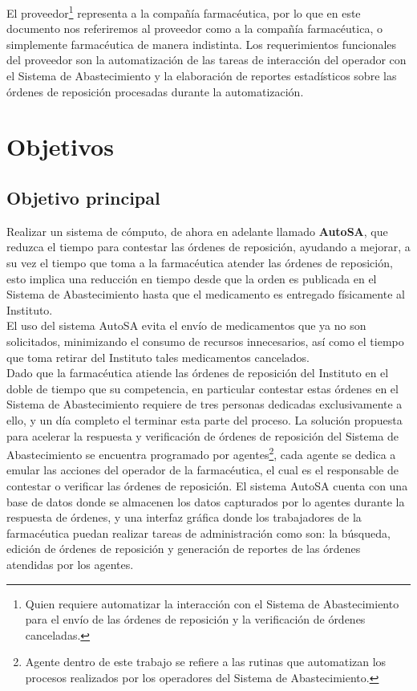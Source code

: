 El proveedor\footnote{Quien requiere automatizar la interacción con el Sistema de Abastecimiento para el envío de las órdenes de reposición y la verificación de órdenes canceladas.} representa a la compañía farmacéutica, por lo que en este documento nos referiremos al proveedor como a la compañía farmacéutica, o simplemente farmacéutica de manera indistinta. Los requerimientos funcionales del proveedor son la automatización de las tareas de interacción del operador con el Sistema de Abastecimiento y la elaboración de reportes estadísticos sobre las órdenes de reposición procesadas durante la automatización.

\section{Objetivos}
\subsection{Objetivo principal}
Realizar un sistema de cómputo, de ahora en adelante llamado \textbf{AutoSA}, que reduzca el tiempo para contestar las órdenes de reposición, ayudando a mejorar, a su vez el tiempo que toma a la farmacéutica atender las órdenes de reposición, esto implica una reducción en tiempo desde que la orden es publicada en el Sistema de Abastecimiento hasta que el medicamento es entregado físicamente al Instituto.\\
El uso del sistema AutoSA evita el envío de medicamentos que ya no son solicitados, minimizando el consumo de recursos innecesarios, así como el tiempo que toma retirar del Instituto tales medicamentos cancelados.\\
Dado que la farmacéutica atiende las órdenes de reposición del Instituto en el doble de tiempo que su competencia, en particular contestar estas órdenes en el Sistema de Abastecimiento requiere de tres personas dedicadas exclusivamente a ello, y un día completo el terminar esta parte del proceso. La solución propuesta para acelerar la respuesta y verificación de órdenes de reposición del Sistema de Abastecimiento se encuentra programado por agentes\footnote{Agente dentro de este trabajo se refiere a las rutinas que automatizan los procesos realizados por los operadores del Sistema de Abastecimiento.}, cada agente se dedica a emular las acciones del operador de la farmacéutica, el cual es el responsable de contestar o verificar las órdenes de reposición. El sistema AutoSA cuenta con una base de datos donde se almacenen los datos capturados por lo agentes durante la respuesta de órdenes, y una interfaz gráfica donde los trabajadores de la farmacéutica puedan realizar tareas de administración como son: la búsqueda, edición de órdenes de reposición y generación de reportes de las órdenes atendidas por los agentes.
